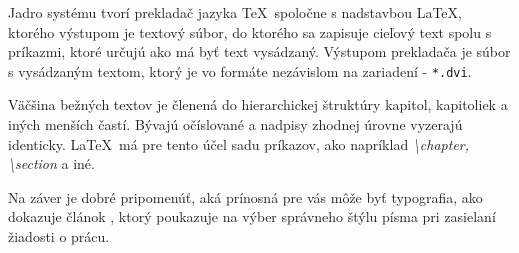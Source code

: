 \documentclass[12pt, a4paper, czech]{article}
\begin{document}
	Jadro systému tvorí prekladač jazyka \TeX\ spoločne s nadstavbou \LaTeX, ktorého výstupom
	je textový súbor, do ktorého sa zapisuje cieľový text spolu s príkazmi, ktoré určujú
	ako má byť text vysádzaný. Výstupom prekladača je súbor s vysádzaným textom, ktorý 
	je vo formáte nezávislom na zariadení - \texttt{*.dvi}. \cite{rybic}
	\par	

	Väčšina bežných textov je členená do hierarchickej štruktúry kapitol, kapitoliek a iných 
	menších častí. Bývajú očíslované a nadpisy zhodnej úrovne vyzerajú identicky. 
	\LaTeX\ má pre tento účel sadu príkazov, ako napríklad 
	\textit{\textbackslash chapter, \textbackslash section} a iné. \cite{satra} 
	\par
	
	Na záver je dobré pripomenúť, aká prínosná pre vás môže byť typografia, ako dokazuje článok \cite{wong}, ktorý poukazuje na výber správneho štýlu písma pri zasielaní žiadosti o prácu.
	
	
	
	
	

	
	
	
	
		
	

	

	
	
	\newpage
	
	\renewcommand{\refname}{Literatúra}
	
	
\end{document}
